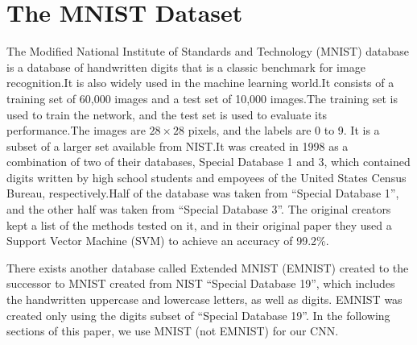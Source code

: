 \documentclass[conference]{IEEEtran}
\begin{document}
\section{The MNIST Dataset}
The Modified National Institute of Standards and Technology (MNIST) database is a database of handwritten digits \cite{6296535} that is a classic benchmark for image recognition.\@ It is also widely used in the machine learning world\cite{Platt1998}.\@ It consists of a training set of 60,000 images and a test set of 10,000 images.\@ The training set is used to train the network, and the test set is used to evaluate its performance.\@ The images are $28 \times 28$ pixels, and the labels are 0 to 9. It is a subset of a larger set available from NIST.\@ It was created in 1998 as a combination of two of their databases, Special Database 1 and 3, which contained digits written by high school students and empoyees of the United States Census Bureau, respectively.\@ Half of the database was taken from ``Special Database 1'', and the other half was taken from ``Special Database 3''. The original creators kept a list of the methods tested on it\cite{726791, mnist}, and in their original paper they used a Support Vector Machine (SVM) to achieve an accuracy of 99.2\%\cite{1265868}.
\par
There exists another database called Extended MNIST (EMNIST) created to the successor to MNIST\cite{emnist} created from NIST ``Special Database 19'', which includes the handwritten uppercase and lowercase letters, as well as digits.\cite{emnist2} EMNIST was created only using the digits subset of ``Special Database 19''. In the following sections of this paper, we use MNIST (not EMNIST) for our CNN.\@
\end{document}

